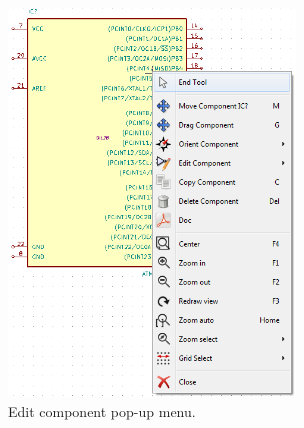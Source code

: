 \documentclass[12pt,letterpaper]{scrartcl}
\begin{document}
\begin{enumerate}
\begin{enumerate}
			\begin{figure}[h]
				\centering
				\includegraphics[width=3in]{edit-component}
				\caption{Edit component pop-up menu.}
				\label{fig:edit-component}
			\end{figure}


\end{enumerate}
\end{enumerate}
\end{document}
